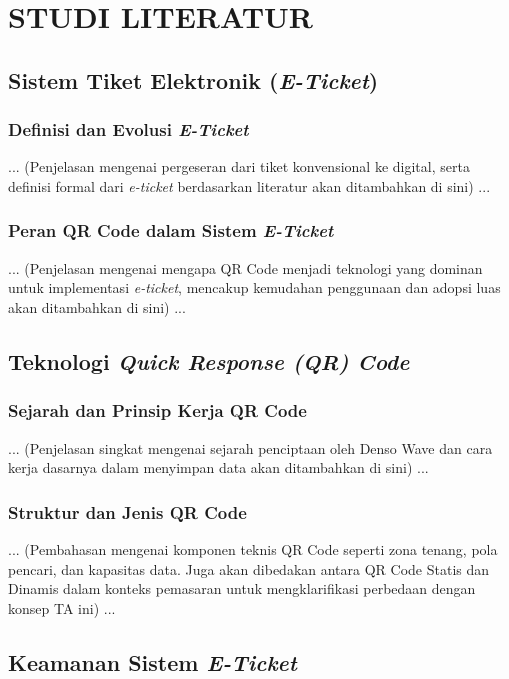 \chapter{STUDI LITERATUR}
\label{chap:studi-literatur}
\section{Sistem Tiket Elektronik (\textit{E-Ticket})}
\subsection{Definisi dan Evolusi \textit{E-Ticket}}
... (Penjelasan mengenai pergeseran dari tiket konvensional ke digital, serta definisi formal dari \textit{e-ticket} berdasarkan literatur akan ditambahkan di sini) ...

\subsection{Peran QR Code dalam Sistem \textit{E-Ticket}}
... (Penjelasan mengenai mengapa QR Code menjadi teknologi yang dominan untuk implementasi \textit{e-ticket}, mencakup kemudahan penggunaan dan adopsi luas akan ditambahkan di sini) ...

\section{Teknologi \textit{Quick Response (QR) Code}}
\subsection{Sejarah dan Prinsip Kerja QR Code}
... (Penjelasan singkat mengenai sejarah penciptaan oleh Denso Wave dan cara kerja dasarnya dalam menyimpan data akan ditambahkan di sini) ...

\subsection{Struktur dan Jenis QR Code}
... (Pembahasan mengenai komponen teknis QR Code seperti zona tenang, pola pencari, dan kapasitas data. Juga akan dibedakan antara QR Code Statis dan Dinamis dalam konteks pemasaran untuk mengklarifikasi perbedaan dengan konsep TA ini) ...

\section{Keamanan Sistem \textit{E-Ticket}}
